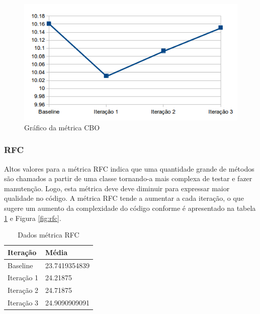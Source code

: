 \documentclass[conference]{IEEEtran}
\begin{document}
\begin{figure}[!htb]
	\begin{center}
		\includegraphics[scale=0.5]{img/cbo.png}
	\end{center}
	\caption{\label{fig:cbo} Gráfico da métrica CBO}   
	
\end{figure}


\subsubsection{RFC}

Altos valores para a métrica RFC indica que uma quantidade grande de métodos são
chamados a partir de uma classe tornando-a mais complexa de testar e fazer
manutenção. Logo, esta métrica deve deve diminuir para expressar maior
qualidade no código. A métrica RFC tende a aumentar a cada iteração, o que
sugere um aumento da complexidade do código conforme é apresentado na tabela \ref{tab:rfc} e Figura
\ref{fig:rfc}.

\begin{table}[!h]
	\centering
	    \caption{\label{tab:rfc} Dados métrica RFC}
    \begin{tabular}{ | l | l | }
    \hline
    Iteração & Média 			\\ \hline
    Baseline & 23.7419354839   	\\ \hline
    Iteração 1 & 24.21875		\\ \hline
	Iteração 2 & 24.71875		\\ \hline
	Iteração 3 & 24.9090909091	\\ \hline
    \end{tabular}
    
\end{table}
\end{document}
